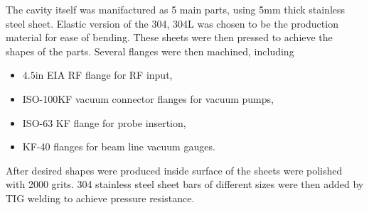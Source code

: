 \documentclass[a4paper,oneside,12pt]{report}
\numberwithin{equation}{chapter}
\begin{document}
{The cavity itself was manifactured as 5 main parts, using 5mm thick stainless steel sheet. 
Elastic version of the 304, 304L was chosen to be the production material for ease of bending.
These sheets were then pressed to achieve the shapes of the parts. 
Several flanges were then machined, including
\begin{itemize}
    \item $4.5$in EIA RF flange for RF input,
    \item ISO-100KF vacuum connector flanges for vacuum pumps,
    \item ISO-63 KF flange for probe insertion,
    \item KF-40 flanges for beam line vacuum gauges.
\end{itemize}
After desired shapes were produced inside surface of the sheets were polished with 2000 grits. 
304 stainless steel sheet bars of different sizes were then added by 
TIG welding to achieve pressure resistance.

}
\end{document}
